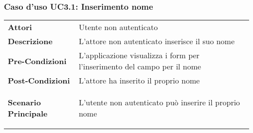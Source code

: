 \subsubsection{Caso d'uso UC3.1:  Inserimento nome}
\label{UC3_1}

\begin{longtable}{ l | p{11cm}}
	\hline
	\rowcolor{Gray}
	 \multicolumn{2}{c}{UC3.1 - Inserimento nome} \\
	 \hline
	\textbf{Attori} & Utente non autenticato \\
	\textbf{Descrizione} & L'attore non autenticato inserisce il suo nome  \\
	\textbf{Pre-Condizioni} & L'applicazione visualizza i form per l'inserimento del campo per il nome \\
	\textbf{Post-Condizioni} & L'attore ha inserito il proprio nome \\
	\textbf{Scenario Principale} & \begin{enumerate*}[label=(\arabic*.),itemjoin={\newline}]
		\item L'utente non autenticato può inserire il proprio nome
	\end{enumerate*}\\
\end{longtable}